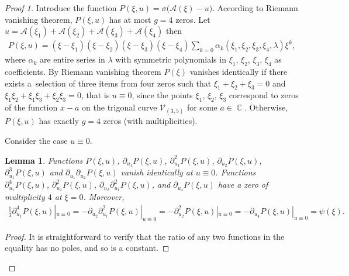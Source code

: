 \documentclass[pdftex]{sigma}
\numberwithin{equation}{section}
\newtheorem{Lemma}[Theorem]{Lemma}
\DeclareMathOperator{\Complex}{\mathbb{C}}
\begin{document}
\begin{proof}[Proof 1] Introduce the function $P(\xi,u)=\sigma\bigl(\mathcal{A}(\xi)-u\bigr)$. According to Riemann vanishing theorem, $P(\xi,u)$ has at most $g=4$ zeros. Let $u=\mathcal{A}(\xi_1)+\mathcal{A}(\xi_2)+\mathcal{A}(\xi_3)+\mathcal{A}(\xi_4)$ then
\begin{gather*}
P(\xi,u) = (\xi-\xi_1)(\xi-\xi_2)(\xi-\xi_3)(\xi-\xi_4)\sum_{k=0}\alpha_k (\xi_1,\xi_2,\xi_3,\xi_4,\lambda)\xi^k,
\end{gather*}
where $\alpha_k$ are entire series in $\lambda$ with symmetric polynomials in $\xi_1$, $\xi_2$, $\xi_3$, $\xi_4$ as coefficients. By Riemann vanishing theorem $P(\xi)$ vanishes identically if there exists a~selection of three items from four zeros such that $\xi_1+\xi_2+\xi_3=0$ and $\xi_1\xi_2+ \xi_1\xi_3+ \xi_2 \xi_3 = 0$, that is $u\equiv 0$, since the points $\xi_1$, $\xi_2$, $\xi_3$ correspond to zeros of the function $x-a$ on the trigonal curve $\mathcal{V}_{(3,5)}$ for some $a\in \Complex$. Otherwise, $P(\xi,u)$ has exactly $g=4$ zeros (with multiplicities).

Consider the case $u\equiv 0$.
\begin{Lemma}\label{L:PsiC35} Functions $P(\xi,u)$, $\partial_{u_1}\! P(\xi,u)$, $\partial_{u_1}^2\! P(\xi,u)$, $\partial_{u_2} \!P(\xi,u)$, $\partial_{u_1}^3 \!P(\xi,u)$ and $\partial_{u_1} \partial_{u_2} P(\xi,u)$ vanish identically at $u\equiv 0$. Functions $\partial^4_{u_1} P(\xi,u)$, $\partial_{u_2}^2 P(\xi,u)$, $\partial_{u_2}\partial^2_{u_1} P(\xi,u)$, and $\partial_{u_4} P(\xi,u)$ have a zero of multiplicity $4$ at $\xi=0$. Moreover,
\begin{gather*}
 \frac{1}{3} \partial^4_{u_1} P(\xi,u)|_{u\equiv 0} = - \partial_{u_2} \partial_{u_1}^2 P(\xi,u)|_{u\equiv 0} = - \partial^2_{u_2} P(\xi,u)|_{u\equiv 0} = - \partial_{u_4} P(\xi,u)|_{u\equiv 0} = \psi(\xi).
\end{gather*}
\end{Lemma}
\begin{proof}It is straightforward to verify that the ratio of any two functions in the equality has no poles, and so is a constant.
\end{proof}


\end{proof}
\end{document}
